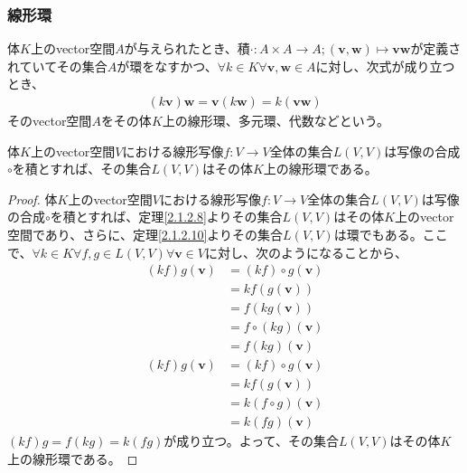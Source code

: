 \documentclass[dvipdfmx]{jsarticle}
\begin{document}
\subsubsection{線形環}%
\begin{dfn}
体$K$上のvector空間$A$が与えられたとき、積$\cdot :A \times A \rightarrow A;\left( \mathbf{v},\mathbf{w} \right) \mapsto \mathbf{vw}$が定義されていてその集合$A$が環をなすかつ、$\forall k \in K\forall\mathbf{v},\mathbf{w} \in A$に対し、次式が成り立つとき、
\begin{align*}
\left( k\mathbf{v} \right)\mathbf{w} = \mathbf{v}\left( k\mathbf{w} \right) = k\left( \mathbf{vw} \right)
\end{align*}
そのvector空間$A$をその体$K$上の線形環、多元環、代数などという。
\end{dfn}
\begin{thm}\label{2.4.2.1}
体$K$上のvector空間$V$における線形写像$f:V \rightarrow V$全体の集合$L(V,V)$は写像の合成$\circ$を積とすれば、その集合$L(V,V)$はその体$K$上の線形環である。
\end{thm}
\begin{proof}
体$K$上のvector空間$V$における線形写像$f:V \rightarrow V$全体の集合$L(V,V)$は写像の合成$\circ$を積とすれば、定理\ref{2.1.2.8}よりその集合$L(V,V)$はその体$K$上のvector空間であり、さらに、定理\ref{2.1.2.10}よりその集合$L(V,V)$は環でもある。ここで、$\forall k \in K\forall f,g \in L(V,V)\forall\mathbf{v} \in V$に対し、次のようになることから、
\begin{align*}
(kf)g\left( \mathbf{v} \right) &= (kf) \circ g\left( \mathbf{v} \right)\\
&= kf\left( g\left( \mathbf{v} \right) \right)\\
&= f\left( kg\left( \mathbf{v} \right) \right)\\
&= f \circ (kg)\left( \mathbf{v} \right)\\
&= f(kg)\left( \mathbf{v} \right)\\
(kf)g\left( \mathbf{v} \right) &= (kf) \circ g\left( \mathbf{v} \right)\\
&= kf\left( g\left( \mathbf{v} \right) \right)\\
&= k(f \circ g)\left( \mathbf{v} \right)\\
&= k(fg)\left( \mathbf{v} \right)
\end{align*}
$(kf)g = f(kg) = k(fg)$が成り立つ。よって、その集合$L(V,V)$はその体$K$上の線形環である。
\end{proof}
\end{document}
